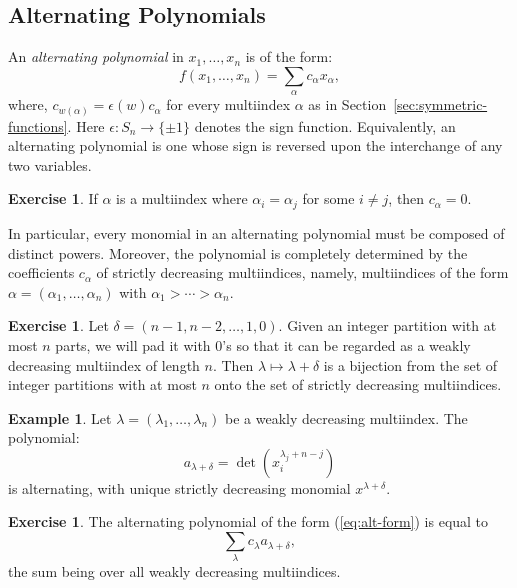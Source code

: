 \documentclass[11pt]{amsart}
\theoremstyle{definition}
\theoremstyle{example}
\newtheorem{example}[theorem]{Example}
\newtheorem{exercise}[theorem]{Exercise}
\begin{document}
\subsection{Alternating Polynomials}
\label{sec:alt-poly}
An \emph{alternating polynomial} in $x_1,\dotsc, x_n$ is of the form:
\begin{equation}
  \label{eq:alt-form}
  f(x_1,\dotsc,x_n) = \sum_{\alpha} c_\alpha x_\alpha,
\end{equation}
where, $c_{w(\alpha)} = \epsilon(w)c_\alpha$ for every multiindex $\alpha$ as in Section~\ref{sec:symmetric-functions}.
Here $\epsilon:S_n\to \{\pm 1\}$ denotes the sign function.
Equivalently, an alternating polynomial is one whose sign is reversed upon the interchange of any two variables.
\begin{exercise}
  If $\alpha$ is a multiindex where $\alpha_i=\alpha_j$ for some $i\neq j$, then $c_\alpha = 0$.
\end{exercise}
In particular, every monomial in an alternating polynomial must be composed of distinct powers.
Moreover, the polynomial is completely determined by the coefficients $c_\alpha$ of strictly decreasing multiindices, namely, multiindices of the form $\alpha=(\alpha_1,\dotsc,\alpha_n)$ with $\alpha_1>\dotsb>\alpha_n$.
\begin{exercise}
  Let $\delta=(n-1,n-2,\dotsc,1, 0)$.
  Given an integer partition with at most $n$ parts, we will pad it with $0$'s so that it can be regarded as a weakly decreasing multiindex of length $n$.
  Then $\lambda\mapsto \lambda+\delta$ is a bijection from the set of integer partitions with at most $n$ onto the set of strictly decreasing multiindices.
\end{exercise}
\begin{example}
  Let $\lambda = (\lambda_1,\dotsc, \lambda_n)$ be a weakly decreasing multiindex.
  The polynomial:
  \begin{displaymath}
    a_{\lambda+\delta} = \det(x_i^{\lambda_j + n - j})
  \end{displaymath}
  is alternating, with unique strictly decreasing monomial $x^{\lambda+\delta}$.
\end{example}
\begin{exercise}
  \label{exercise:alt-basis}
  The alternating polynomial of the form \textup{(\ref{eq:alt-form})} is equal to  \begin{displaymath}
    \sum_{\lambda} c_\lambda a_{\lambda+\delta},
  \end{displaymath}
  the sum being over all weakly decreasing multiindices.
\end{exercise}
\end{document}
